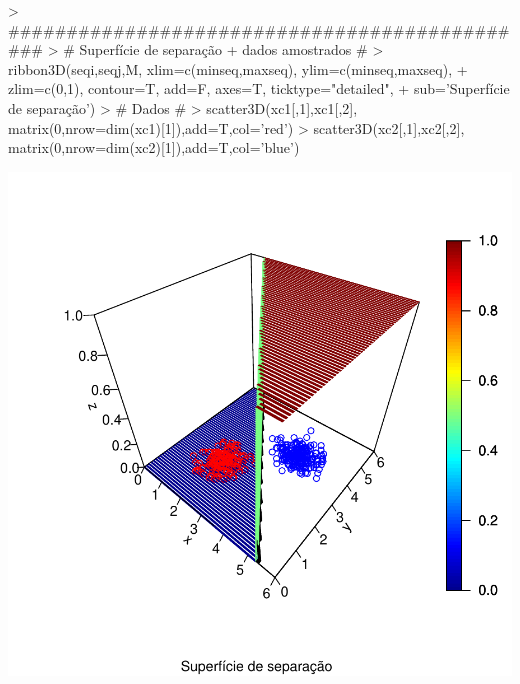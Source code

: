 \documentclass{article}
\begin{document}
\begin{Schunk}
\begin{Sinput}
> ##############################################
> # Superfície de separação + dados amostrados #
> ribbon3D(seqi,seqj,M, xlim=c(minseq,maxseq), ylim=c(minseq,maxseq), 
+          zlim=c(0,1), contour=T, add=F, axes=T, ticktype="detailed",
+          sub='Superfície de separação')
> # Dados #
> scatter3D(xc1[,1],xc1[,2], matrix(0,nrow=dim(xc1)[1]),add=T,col='red')
> scatter3D(xc2[,1],xc2[,2], matrix(0,nrow=dim(xc2)[1]),add=T,col='blue')
\end{Sinput}
\end{Schunk}
\includegraphics{perceptron-007}
\end{document}
